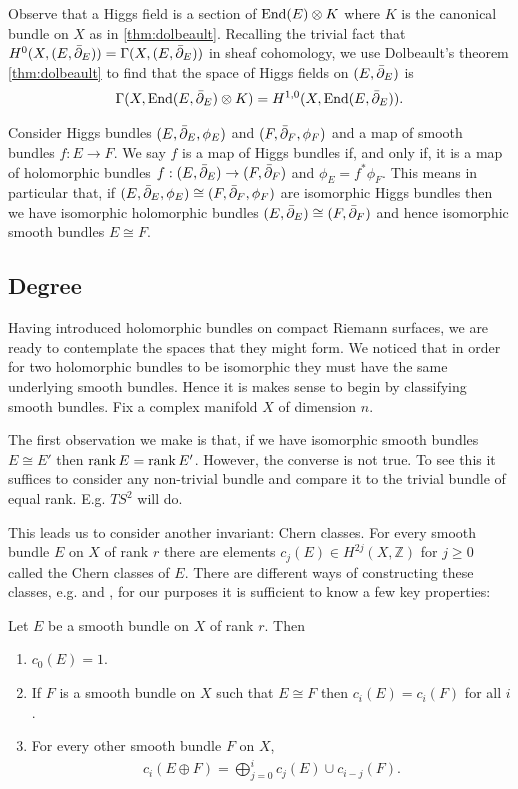 \documentclass[12pt]{ociamthesis}  %
\begin{document}
Observe that a Higgs field is a section of $\operatorname{End}(E) \otimes K$
where $K$ is the canonical bundle on $X$ as in \ref{thm:dolbeault}.
Recalling the trivial fact that $H^0(X,(E,{\bar{\partial}}_E))=\Gamma(X,(E,{\bar{\partial}}_E))$
in sheaf cohomology, we use Dolbeault's theorem \ref{thm:dolbeault} to
find that the space of Higgs fields on $(E,{\bar{\partial}}_E)$ is
\begin{align*}
  \Gamma(X,\operatorname{End}(E,{\bar{\partial}}_E)\otimes K) = H^{1,0}(X,\operatorname{End}(E,{\bar{\partial}}_E)).
\end{align*}

Consider Higgs bundles $(E,{\bar{\partial}}_E,\phi_E)$ and $(F,{\bar{\partial}}_F,\phi_F)$
and a map of smooth bundles $f:E\to F$. We say $f$ is a map of Higgs
bundles if, and only if, it is a map of holomorphic bundles
$f:(E,{\bar{\partial}}_E)\to (F,{\bar{\partial}}_F)$ and $\phi_E = f^*\phi_F$.
This means in particular that, if
$(E,{\bar{\partial}}_E,\phi_E)\cong(F,{\bar{\partial}}_F,\phi_F)$
are isomorphic Higgs bundles then we have isomorphic holomorphic bundles
$(E,{\bar{\partial}}_E)\cong(F,{\bar{\partial}}_F)$ and hence isomorphic smooth bundles
$E\cong F$.

\subsection{Degree}

Having introduced holomorphic bundles on compact Riemann surfaces,
we are ready to contemplate the spaces that they might form.
We noticed that in order for two holomorphic bundles to be isomorphic
they must have the same underlying smooth bundles. Hence it is makes
sense to begin by classifying smooth bundles. Fix a complex manifold $X$
of dimension $n$.

The first observation we make is that, if we have isomorphic smooth
bundles $E\cong E'$ then $\operatorname{rank} E = \operatorname{rank} E'$. However, the converse
is not true. To see this it suffices to consider any non-trivial
bundle and compare it to the trivial bundle of equal rank. E.g.
$TS^2$ will do.

This leads us to consider another invariant: Chern classes. For
every smooth bundle $E$ on $X$ of rank $r$ there are elements
$c_j(E)\in H^{2j}(X,\mathbb{Z})$ for $j\geq 0$ called the Chern
classes of $E$. There are different ways of constructing these classes,
e.g. \cite{fine2013} and \cite{griffiths1994}, for our purposes
it is sufficient to know a few key properties:

\begin{lemma}\label{lem:chern_classes}
  Let $E$ be a smooth bundle on $X$ of rank $r$. Then
  \begin{enumerate}
    \item $c_0(E) = 1$.
    \item If $F$ is a smooth bundle on $X$ such that $E\cong F$
          then $c_i(E) = c_i(F)$ for all $i$.
    \item For every other smooth bundle $F$ on $X$,
          \begin{align*}
            c_i(E\oplus F) = \bigoplus_{j=0}^{i} c_j(E)\cup c_{i-j}(F).
          \end{align*}
  \end{enumerate}
\end{lemma}
\end{document}
